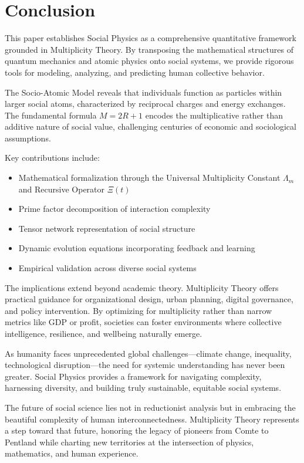 \documentclass[11pt,a4paper]{article}
\begin{document}
\section{Conclusion}
\label{sec:conclusion}

This paper establishes Social Physics as a comprehensive quantitative framework grounded in Multiplicity Theory. By transposing the mathematical structures of quantum mechanics and atomic physics onto social systems, we provide rigorous tools for modeling, analyzing, and predicting human collective behavior.

The Socio-Atomic Model reveals that individuals function as particles within larger social atoms, characterized by reciprocal charges and energy exchanges. The fundamental formula $M = 2R + 1$ encodes the multiplicative rather than additive nature of social value, challenging centuries of economic and sociological assumptions.

Key contributions include:

\begin{itemize}
    \item Mathematical formalization through the Universal Multiplicity Constant $\Lambda_m$ and Recursive Operator $\Xi(t)$
    \item Prime factor decomposition of interaction complexity
    \item Tensor network representation of social structure
    \item Dynamic evolution equations incorporating feedback and learning
    \item Empirical validation across diverse social systems
\end{itemize}

The implications extend beyond academic theory. Multiplicity Theory offers practical guidance for organizational design, urban planning, digital governance, and policy intervention. By optimizing for multiplicity rather than narrow metrics like GDP or profit, societies can foster environments where collective intelligence, resilience, and wellbeing naturally emerge.

As humanity faces unprecedented global challenges—climate change, inequality, technological disruption—the need for systemic understanding has never been greater. Social Physics provides a framework for navigating complexity, harnessing diversity, and building truly sustainable, equitable social systems.

The future of social science lies not in reductionist analysis but in embracing the beautiful complexity of human interconnectedness. Multiplicity Theory represents a step toward that future, honoring the legacy of pioneers from Comte to Pentland while charting new territories at the intersection of physics, mathematics, and human experience.
\end{document}
